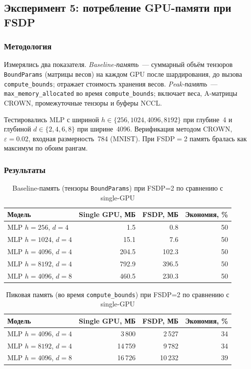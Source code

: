 \subsection{Эксперимент 5: потребление GPU-памяти при FSDP}

\subsubsection{Методология}

Измерялись два показателя.
\textit{Baseline-память}~--- суммарный объём тензоров \texttt{BoundParams}
(матрицы весов) на каждом GPU после шардирования, до вызова
\texttt{compute\_bounds}; отражает стоимость хранения весов.
\textit{Peak-память}~--- \texttt{max\_memory\_allocated} во время
\texttt{compute\_bounds}; включает веса, A-матрицы CROWN,
промежуточные тензоры и буферы NCCL.

Тестировались MLP с шириной $h \in \{256, 1024, 4096, 8192\}$
при глубине~4 и глубиной $d \in \{2, 4, 6, 8\}$ при ширине~4096.
Верификация методом CROWN, $\varepsilon = 0.02$, входная
размерность~784 (MNIST). При FSDP$=$2 память бралась как
максимум по обоим рангам.

\subsubsection{Результаты}

\begin{table}[htbp]
\centering
\caption{Baseline-память (тензоры \texttt{BoundParams}) при FSDP=2
по сравнению с single-GPU}
\label{tab:fsdp-baseline}
\begin{tabular}{lrrr}
\toprule
Модель & Single GPU, МБ & FSDP, МБ & Экономия, \% \\
\midrule
MLP $h{=}256$, $d{=}4$   &      1.5 &   0.8 & 50 \\
MLP $h{=}1024$, $d{=}4$  &     15.1 &   7.6 & 50 \\
MLP $h{=}4096$, $d{=}4$  &    204.5 & 102.3 & 50 \\
MLP $h{=}8192$, $d{=}4$  &    792.9 & 396.5 & 50 \\
MLP $h{=}4096$, $d{=}8$  &    460.5 & 230.3 & 50 \\
\bottomrule
\end{tabular}
\end{table}

\begin{table}[htbp]
\centering
\caption{Пиковая память (во время \texttt{compute\_bounds})
при FSDP=2 по сравнению с single-GPU}
\label{tab:fsdp-peak}
\begin{tabular}{lrrr}
\toprule
Модель & Single GPU, МБ & FSDP, МБ & Экономия, \% \\
\midrule
MLP $h{=}4096$, $d{=}4$  &   3\,800 &  2\,527 & 34 \\
MLP $h{=}8192$, $d{=}4$  &  14\,759 &  9\,782 & 34 \\
MLP $h{=}4096$, $d{=}8$  &  16\,726 & 10\,232 & 39 \\
\bottomrule
\end{tabular}
\end{table}

